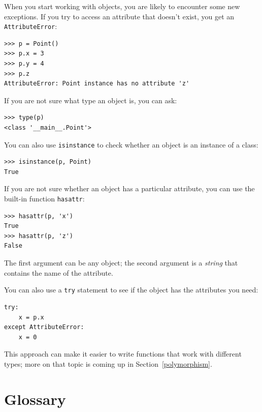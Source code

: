 \documentclass[10pt]{book}
\begin{document}
When you start working with objects, you are likely to encounter
some new exceptions.  If you try to access an attribute
that doesn't exist, you get an {\tt AttributeError}:

\begin{verbatim}
>>> p = Point()
>>> p.x = 3
>>> p.y = 4
>>> p.z
AttributeError: Point instance has no attribute 'z'
\end{verbatim}
%
If you are not sure what type an object is, you can ask:

\begin{verbatim}
>>> type(p)
<class '__main__.Point'>
\end{verbatim}
%
You can also use {\tt isinstance} to check whether an object
is an instance of a class:

\begin{verbatim}
>>> isinstance(p, Point)
True
\end{verbatim}
%
If you are not sure whether an object has a particular attribute,
you can use the built-in function {\tt hasattr}:

\begin{verbatim}
>>> hasattr(p, 'x')
True
>>> hasattr(p, 'z')
False
\end{verbatim}
%
The first argument can be any object; the second argument is a {\em
string} that contains the name of the attribute.

You can also use a {\tt try} statement to see if the object has the
attributes you need:

\begin{verbatim}
try:
    x = p.x
except AttributeError:
    x = 0
\end{verbatim}

This approach can make it easier to write functions that work with
different types; more on that topic is
coming up in Section~\ref{polymorphism}.


\section{Glossary}
\end{document}
